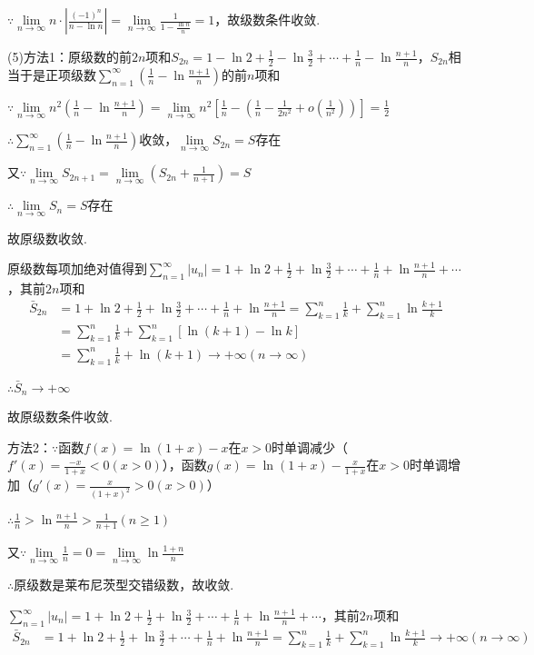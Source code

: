 \documentclass[12pt,UTF8]{ctexart}
\newcommand\Lim[0]{\lim\limits_{n\rightarrow\infty}}
\begin{document}
\begin{enumerate}
$\because\Lim n\cdot|\frac{(-1)^n}{n-\ln n}|=\Lim\frac1{1-\frac{\ln n}n}=1$，故级数条件收敛.

(5)方法1：原级数的前$2n$项和$S_{2n}=1-\ln2+\frac12-\ln\frac32+\cdots+\frac1n-\ln\frac{n+1}n$，$S_{2n}$相当于是正项级数$\sum_{n=1}^\infty(\frac1n-\ln\frac{n+1}n)$的前$n$项和

$\because\lim\limits_{n\rightarrow\infty}n^2(\frac1n-\ln\frac{n+1}n)=\lim\limits_{n\rightarrow\infty}n^2[\frac1n-(\frac1n-\frac1{2n^2}+o(\frac1{n^2}))]=\frac12$

$\therefore\sum_{n=1}^\infty(\frac1n-\ln\frac{n+1}n)$收敛，$\lim\limits_{n\rightarrow\infty}S_{2n}=S$存在

又$\because\lim\limits_{n\rightarrow\infty}S_{2n+1}=\lim\limits_{n\rightarrow\infty}(S_{2n}+\frac1{n+1})=S$

$\therefore\lim\limits_{n\rightarrow\infty}S_n=S$存在

故原级数收敛.

原级数每项加绝对值得到$\sum_{n=1}^\infty|u_n|=1+\ln2+\frac12+\ln\frac32+\cdots+\frac1n+\ln\frac{n+1}n+\cdots$，其前$2n$项和
\[\begin{split}
\bar{S}_{2n}&=1+\ln2+\frac12+\ln\frac32+\cdots+\frac1n+\ln\frac{n+1}n=\sum_{k=1}^n\frac1k+\sum_{k=1}^n\ln\frac{k+1}k\\
&=\sum_{k=1}^n\frac1k+\sum_{k=1}^n[\ln(k+1)-\ln k]\\
&=\sum_{k=1}^n\frac1k+\ln(k+1)\rightarrow+\infty(n\rightarrow\infty)
\end{split}\]


$\therefore\bar{S}_n\rightarrow+\infty$

故原级数条件收敛.

方法2：$\because$函数$f(x)=\ln(1+x)-x$在$x>0$时单调减少（$f'(x)=\frac{-x}{1+x}<0(x>0)$），函数$g(x)=\ln(1+x)-\frac x{1+x}$在$x>0$时单调增加（$g'(x)=\frac x{(1+x)^2}>0(x>0)$）

$\therefore\frac1n>\ln\frac{n+1}n>\frac1{n+1}(n\geq1)$

又$\because\lim\limits_{n\rightarrow\infty}\frac1n=0=\lim\limits_{n\rightarrow\infty}\ln\frac{1+n}n$

$\therefore$原级数是莱布尼茨型交错级数，故收敛.

$\sum_{n=1}^\infty|u_n|=1+\ln2+\frac12+\ln\frac32+\cdots+\frac1n+\ln\frac{n+1}n+\cdots$，其前$2n$项和
\[\begin{split}
\bar{S}_{2n}&=1+\ln2+\frac12+\ln\frac32+\cdots+\frac1n+\ln\frac{n+1}n=\sum_{k=1}^n\frac1k+\sum_{k=1}^n\ln\frac{k+1}k\rightarrow+\infty(n\rightarrow\infty)
\end{split}\]


\end{enumerate}
\end{document}
